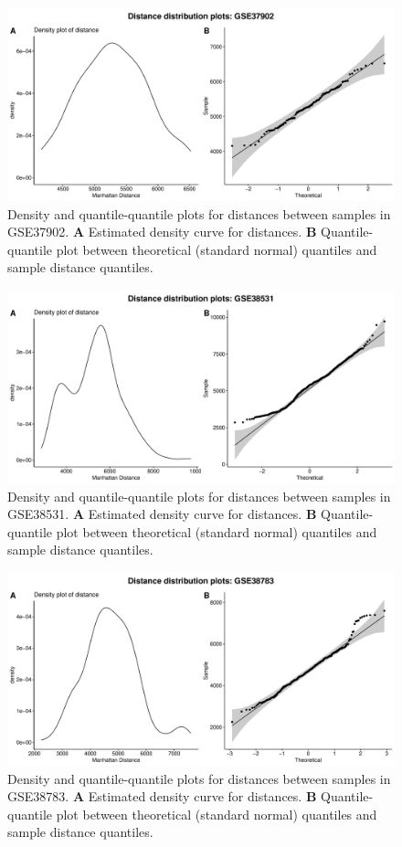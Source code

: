 \documentclass[10pt,letterpaper]{article}\usepackage[]{graphicx}\usepackage[]{color}
\begin{document}
\begin{figure}[H]
	\includegraphics[width=\textwidth]{manhattan-distance_hist_GSE37902.pdf}
	\caption{Density and quantile-quantile plots for distances between samples in GSE37902. \textbf{A} Estimated density curve for distances. \textbf{B} Quantile-quantile plot between theoretical (standard normal) quantiles and sample distance quantiles.}
\end{figure}

\begin{figure}[H]
	\includegraphics[width=\textwidth]{manhattan-distance_hist_GSE38531.pdf}
	\caption{Density and quantile-quantile plots for distances between samples in GSE38531. \textbf{A} Estimated density curve for distances. \textbf{B} Quantile-quantile plot between theoretical (standard normal) quantiles and sample distance quantiles.}
\end{figure}

\begin{figure}[H]
	\includegraphics[width=\textwidth]{manhattan-distance_hist_GSE38783.pdf}
	\caption{Density and quantile-quantile plots for distances between samples in GSE38783. \textbf{A} Estimated density curve for distances. \textbf{B} Quantile-quantile plot between theoretical (standard normal) quantiles and sample distance quantiles.}
\end{figure}
\end{document}

